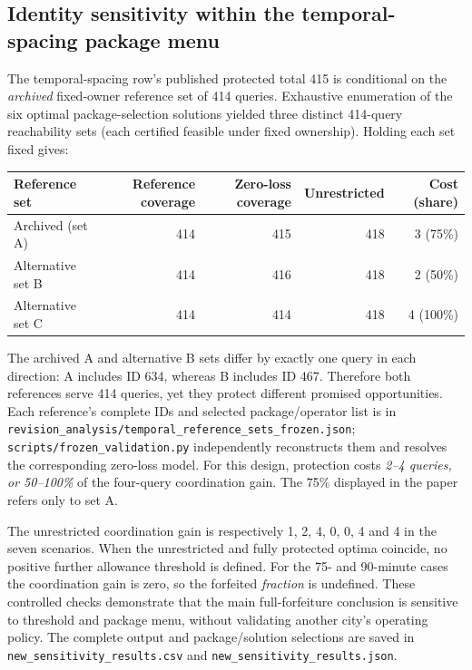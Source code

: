 \documentclass[10pt]{article}
\newcommand{\st}[1]{\texttt{\footnotesize #1}}
\begin{document}
\subsection*{Identity sensitivity within the temporal-spacing package menu}
The temporal-spacing row's published protected total 415 is conditional on the \emph{archived} fixed-owner reference set of 414 queries. Exhaustive enumeration of the six optimal package-selection solutions yielded three distinct 414-query reachability sets (each certified feasible under fixed ownership). Holding each set fixed gives:
\begin{center}\small
\begin{tabular}{@{}lrrrr@{}}\toprule
Reference set & Reference coverage & Zero-loss coverage & Unrestricted & Cost (share) \\\midrule
Archived (set A) & 414 & 415 & 418 & 3 (75\%) \\
Alternative set B & 414 & 416 & 418 & 2 (50\%) \\
Alternative set C & 414 & 414 & 418 & 4 (100\%) \\\bottomrule
\end{tabular}
\end{center}
The archived A and alternative B sets differ by exactly one query in each direction: A includes ID 634, whereas B includes ID 467. Therefore both references serve 414 queries, yet they protect different promised opportunities. Each reference's complete IDs and selected package/operator list is in \st{revision\_analysis/temporal\_reference\_sets\_frozen.json}; \st{scripts/frozen\_validation.py} independently reconstructs them and resolves the corresponding zero-loss model. For this design, protection costs \emph{2--4 queries, or 50--100\%} of the four-query coordination gain. The 75\% displayed in the paper refers only to set A.

The unrestricted coordination gain is respectively 1, 2, 4, 0, 0, 4 and 4 in the seven scenarios. When the unrestricted and fully protected optima coincide, no positive further allowance threshold is defined. For the 75- and 90-minute cases the coordination gain is zero, so the forfeited \emph{fraction} is undefined. These controlled checks demonstrate that the main full-forfeiture conclusion is sensitive to threshold and package menu, without validating another city's operating policy. The complete output and package/solution selections are saved in \st{new\_sensitivity\_results.csv} and \st{new\_sensitivity\_results.json}.
\end{document}
